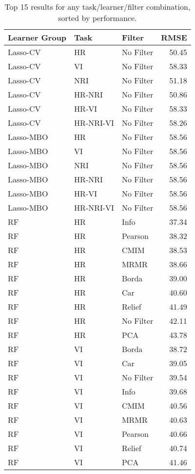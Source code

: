 \begin{longtable}{lllr}
\caption{Top 15 results for any task/learner/filter combination, sorted by performance.} \\ 
  \toprule
Learner Group & Task & Filter & RMSE \\ 
  \midrule
Lasso-CV & HR & No Filter & 50.45 \\ 
  Lasso-CV & VI & No Filter & 58.33 \\ 
  Lasso-CV & NRI & No Filter & 51.18 \\ 
  Lasso-CV & HR-NRI & No Filter & 50.86 \\ 
  Lasso-CV & HR-VI & No Filter & 58.33 \\ 
  Lasso-CV & HR-NRI-VI & No Filter & 58.26 \\ 
  Lasso-MBO & HR & No Filter & 58.56 \\ 
  Lasso-MBO & VI & No Filter & 58.56 \\ 
  Lasso-MBO & NRI & No Filter & 58.56 \\ 
  Lasso-MBO & HR-NRI & No Filter & 58.56 \\ 
  Lasso-MBO & HR-VI & No Filter & 58.56 \\ 
  Lasso-MBO & HR-NRI-VI & No Filter & 58.56 \\ 
  RF & HR & Info & 37.34 \\ 
  RF & HR & Pearson & 38.32 \\ 
  RF & HR & CMIM & 38.53 \\ 
  RF & HR & MRMR & 38.66 \\ 
  RF & HR & Borda & 39.00 \\ 
  RF & HR & Car & 40.60 \\ 
  RF & HR & Relief & 41.49 \\ 
  RF & HR & No Filter & 42.11 \\ 
  RF & HR & PCA & 43.78 \\ 
  RF & VI & Borda & 38.72 \\ 
  RF & VI & Car & 39.05 \\ 
  RF & VI & No Filter & 39.54 \\ 
  RF & VI & Info & 39.68 \\ 
  RF & VI & CMIM & 40.56 \\ 
  RF & VI & MRMR & 40.63 \\ 
  RF & VI & Pearson & 40.66 \\ 
  RF & VI & Relief & 40.74 \\ 
  RF & VI & PCA & 41.46 \\ 

\end{longtable}
